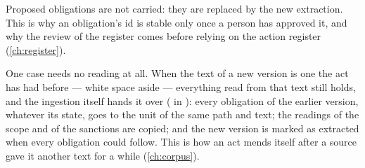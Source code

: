 Proposed obligations are not carried: they are replaced by the new extraction. This is why an
obligation's id is stable only once a person has approved it, and why the review of the
register comes before relying on the action register (\cref{ch:register}).

One case needs no reading at all. When the text of a new version is one the act has had
before --- white space aside --- everything read from that text still holds, and the
ingestion itself hands it over ( in ): every
obligation of the earlier version, whatever its state, goes to the unit of the same path and
text; the readings of the scope and of the sanctions are copied; and the new version is
marked as extracted when every obligation could follow. This is how an act mends itself
after a source gave it another text for a while (\cref{ch:corpus}).

